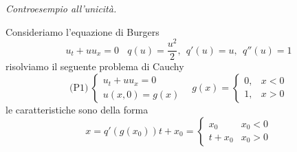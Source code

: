 \documentclass[10pt,a4paper,twoside,openright]{book}
\begin{document}
\textit{Controesempio all'unicità.}

Consideriamo l'equazione di Burgers
\begin{equation}
	u_{t} +uu_{x} =0\ \ \ \ q( u) =\frac{u^{2}}{2} ,\ \ q'( u) =u,\ \ q''( u) =1
\end{equation}
risolviamo il seguente problema di Cauchy
\begin{equation*}
	\text{(P1)} \ 
	\begin{cases}
		u_{t} +uu_{x} =0 \\
		u( x,0) =g( x)   
	\end{cases} \ \ \ \ g( x) =
	\begin{cases}
		0, & x< 0 \\
		1, & x >0 
	\end{cases}
\end{equation*}
le caratteristiche sono della forma
\begin{equation*}
	x=q'( g( x_{0})) t+x_{0} =
	\begin{cases}
		x_{0}   & x_{0} < 0 \\
		t+x_{0} & x_{0}  >0 
	\end{cases}
\end{equation*}
\end{document}
